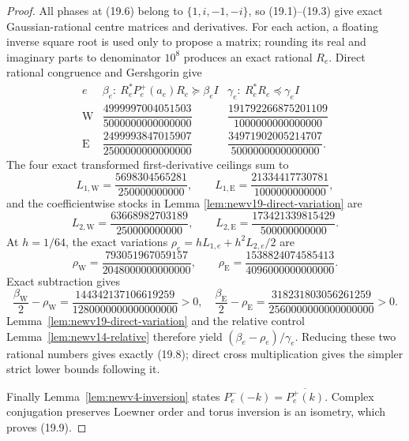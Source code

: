 \documentclass[11pt,oneside]{article}
\theoremstyle{definition}
\theoremstyle{remark}
\begin{document}
\begin{proof}
All phases at (19.6) belong to \(\{1,i,-1,-i\}\), so (19.1)--(19.3)
give exact Gaussian-rational centre matrices and derivatives.  For
each action, a floating inverse square root is used only to propose
a matrix; rounding its real and imaginary parts to denominator
\(10^8\) produces an exact rational \(R_e\).  Direct rational
congruence and Gershgorin give
\[
\begin{array}{c|cc}
e&\beta_e:\ R_e^*P_e^+(a_e)R_e\succeq\beta_eI&
\gamma_e:\ R_e^*R_e\preceq\gamma_eI\\ \hline
\mathrm W&
\dfrac{4999997004051503}{5000000000000000}&
\dfrac{191792266875201109}{1000000000000000}\\[5pt]
\mathrm E&
\dfrac{2499993847015907}{2500000000000000}&
\dfrac{34971902005214707}{5000000000000000}.
\end{array}                                              \tag{19.10}
\]
The four exact transformed first-derivative ceilings sum to
\[
 L_{1,\mathrm W}=\frac{5698304565281}{250000000000},
 \qquad
 L_{1,\mathrm E}=\frac{21334417730781}{1000000000000},
                                                               \tag{19.11}
\]
and the coefficientwise stocks in Lemma
\ref{lem:newv19-direct-variation} are
\[
 L_{2,\mathrm W}=\frac{63668982703189}{250000000000},
 \qquad
 L_{2,\mathrm E}=\frac{173421339815429}{500000000000}.
                                                               \tag{19.12}
\]
At \(h=1/64\), the exact variations
\(\rho_e=hL_{1,e}+h^2L_{2,e}/2\) are
\[
 \rho_{\mathrm W}=
 \frac{793051967059157}{2048000000000000},\qquad
 \rho_{\mathrm E}=
 \frac{1538824074585413}{4096000000000000}.              \tag{19.13}
\]
Exact subtraction gives
\[
\frac{\beta_{\mathrm W}}2-\rho_{\mathrm W}
=\frac{144342137106619259}{1280000000000000000}>0,
\quad
\frac{\beta_{\mathrm E}}2-\rho_{\mathrm E}
=\frac{318231803056261259}{2560000000000000000}>0.       \tag{19.14}
\]
Lemma~\ref{lem:newv19-direct-variation} and the relative control
Lemma~\ref{lem:newv14-relative} therefore yield
\((\beta_e-\rho_e)/\gamma_e\).  Reducing these two rational numbers
gives exactly (19.8); direct cross multiplication gives the simpler
strict lower bounds following it.

Finally Lemma~\ref{lem:newv4-inversion} states
\(P_e^-(-k)=\overline{P_e^+(k)}\).  Complex conjugation preserves
Loewner order and torus inversion is an isometry, which proves
(19.9).
\end{proof}
\end{document}
